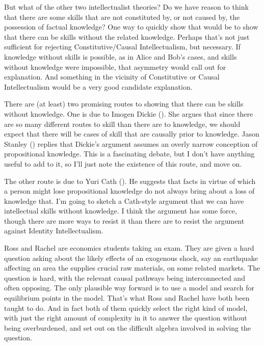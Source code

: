 \documentclass[
  10pt,
  letterpaper,
  DIV=11,
  numbers=noendperiod,
  twoside]{scrartcl}
\begin{document}
But what of the other two intellectualist theories? Do we have reason to
think that there are some skills that are not constituted by, or not
caused by, the possession of factual knowledge? One way to quickly show
that would be to show that there can be skills without the related
knowledge. Perhaps that's not just sufficient for rejecting
Constitutive/Causal Intellectualism, but necessary. If knowledge without
skills is possible, as in Alice and Bob's cases, and skills without
knowledge were impossible, that asymmetry would call out for
explanation. And something in the vicinity of Constitutive or Causal
Intellectualism would be a very good candidate explanation.

There are (at least) two promising routes to showing that there can be
skills without knowledge. One is due to Imogen Dickie
(). She argues that since there are so
many different routes to skill than there are to knowledge, we should
expect that there will be cases of skill that are causally prior to
knowledge. Jason Stanley ()
replies that Dickie's argument assumes an overly narrow conception of
propositional knowledge. This is a fascinating debate, but I don't have
anything useful to add to it, so I'll just note the existence of this
route, and move on.

The other route is due to Yuri Cath (). He
suggests that facts in virtue of which a person might lose propositional
knowledge do not always bring about a loss of knowledge that. I'm going
to sketch a Cath-style argument that we can have intellectual skills
without knowledge. I think the argument has some force, though there are
more ways to resist it than there are to resist the argument against
Identity Intellectualism.

Ross and Rachel are economics students taking an exam. They are given a
hard question asking about the likely effects of an exogenous shock, say
an earthquake affecting an area the supplies crucial raw materials, on
some related markets. The question is hard, with the relevant causal
pathways being interconnected and often opposing. The only plausible way
forward is to use a model and search for equilibrium points in the
model. That's what Ross and Rachel have both been taught to do. And in
fact both of them quickly select the right kind of model, with just the
right amount of complexity in it to answer the question without being
overburdened, and set out on the difficult algebra involved in solving
the question.
\end{document}
